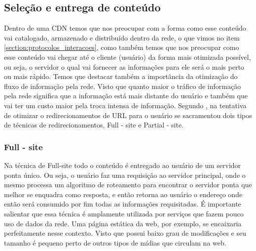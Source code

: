 \subsection{Sele\c{c}\~ao e entrega de conte\'udo}
Dentro de uma CDN temos que  nos preocupar com a forma como esse conte\'udo vai catalogado, armazenado e distribu\'ido dentro da rede, o que vimos no item \ref{section:protocolos_interacoes}, como tamb\'em temos que nos preocupar como esse conte\'udo vai chegar at\'e o cliente (usu\'ario) da forma mais otimizada poss\'ivel, ou seja, o servidor o qual vai fornecer as informa\c{c}\~oes para ele ser\'a o mais perto ou mais r\'apido. 
 Temos que destacar tamb\'em a import\^ancia da otimiza\c{c}\~ao do fluxo de informa\c{c}\~ao pela rede. Visto que quanto maior o tr\'afico de informa\c{c}\~ao pela rede significa que a informa\c{c}\~ao est\'a mais distante do usu\'ario e tamb\'em que vai ter um custo maior pela troca intensa de informa\c{c}\~ao. 
 Segundo \cite{krishnamurthy2001use}, na tentativa de otimizar o redirecionamentos de URL para o usu\'ario se sacramentou dois tipos de t\'ecnicas de redirecionamentos, Full - site e Partial - site.

\subsubsection{Full - site}
Na t\'ecnica de Full-site todo o conte\'udo \'e entregado ao usu\'ario de um servidor ponta \'unico. Ou seja, o usu\'ario faz uma requisi\c{c}\~ao ao servidor principal, onde o mesmo processa um algoritmo de roteamento para encontrar o servidor ponta que melhor se enquadra como resposta, e ent\~ao retorna ao usu\'ario o endere\c{c}o onde ent\~ao ser\'a consumido por fim todas as informa\c{c}\~oes requisitadas. 
 \'E importante salientar que essa t\'ecnica \'e amplamente utilizada por servi\c{c}os que fazem pouco uso de dados da rede. Uma p\'agina est\'atica da web, por exemplo, se encaixaria perfeitamente nesse contexto. Visto que possui baixo grau de modifica\c{c}\~oes e seu tamanho \'e pequeno perto de outros tipos de m\'idias que circulam na web.

